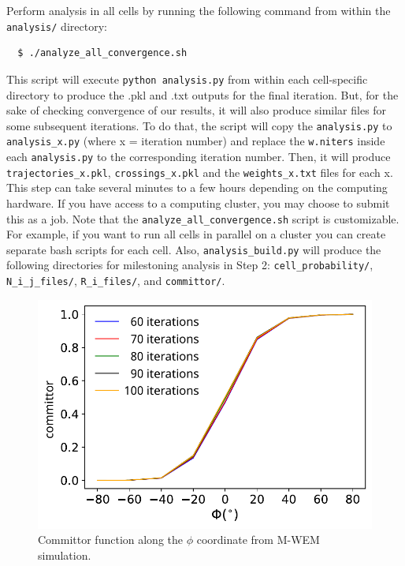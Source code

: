 Perform analysis in all cells by running the following command from within the \verb|analysis/| directory:

\begin{verbatim}
  $ ./analyze_all_convergence.sh
\end{verbatim}

This script will execute \verb|python analysis.py| from within each cell-specific directory to produce the .pkl and .txt outputs for the final iteration. 
But, for the sake of checking convergence of our results, it will also produce similar files for some subsequent iterations. 
To do that, the script will copy the \verb|analysis.py| to \verb|analysis_x.py| (where x = iteration number) and replace the \verb|w.niters| inside each \verb|analysis.py| to the corresponding iteration number. 
Then, it will produce \verb|trajectories_x.pkl|, \verb|crossings_x.pkl| and the \verb|weights_x.txt| files for each x. 
This step can take several minutes to a few hours depending on the computing hardware. 
If you have access to a computing cluster, you may choose to submit this as a job.
Note that the \verb|analyze_all_convergence.sh| script is customizable. 
For example, if you want to run all cells in parallel on a cluster you can create separate bash scripts for each cell. 
Also, \verb|analysis_build.py| will produce the following directories for milestoning analysis in Step 2: \verb|cell_probability/|, \verb|N_i_j_files/|, \verb|R_i_files/|, and \verb|committor/|.

\begin{figure}[t]
\centering
\includegraphics[width=\columnwidth]{figures/Figure11_Committor.pdf}
\caption{Committor function along the $\phi$ coordinate from M-WEM simulation.}
\label{fig:mwem-committor}
\end{figure}

